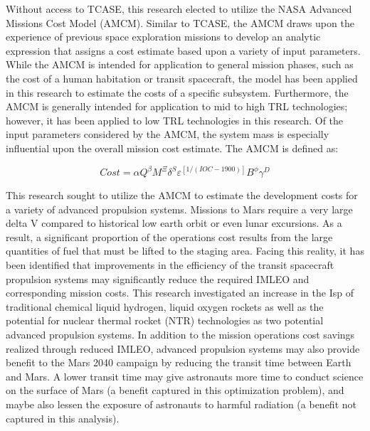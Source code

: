 \documentclass[]{aiaa-pretty}
\begin{document}
Without access to TCASE, this research elected to utilize the NASA Advanced Missions Cost Model (AMCM). Similar to TCASE, the AMCM draws upon the experience of previous space exploration missions to develop an analytic expression that assigns a cost estimate based upon a variety of input parameters. While the AMCM is intended for application to general mission phases, such as the cost of a human habitation or transit spacecraft, the model has been applied in this research to estimate the costs of a specific subsystem. Furthermore, the AMCM is generally intended for application to mid to high TRL technologies; however, it has been applied to low TRL technologies in this research. \cite{jones2015estimating} Of the input parameters considered by the AMCM, the system mass is especially influential upon the overall mission cost estimate. The AMCM is defined as: \cite{larson1999human}

\[ Cost = \alpha Q^\beta M^\Xi \delta^S \varepsilon^{[1/(IOC-1900)]} B^\phi \gamma^D \]

This research sought to utilize the AMCM to estimate the development costs for a variety of advanced propulsion systems. Missions to Mars require a very large delta V compared to historical low earth orbit or even lunar excursions. As a result, a significant proportion of the operations cost results from the large quantities of fuel that must be lifted to the staging area. Facing this reality, it has been identified that improvements in the efficiency of the transit spacecraft propulsion systems may significantly reduce the required IMLEO and corresponding mission costs. This research investigated an increase in the Isp of traditional chemical liquid hydrogen, liquid oxygen rockets as well as the potential for nuclear thermal rocket (NTR) technologies as two potential advanced propulsion systems. In addition to the mission operations cost savings realized through reduced IMLEO, advanced propulsion systems may also provide benefit to the Mars 2040 campaign by reducing the transit time between Earth and Mars. A lower transit time may give astronauts more time to conduct science on the surface of Mars (a benefit captured in this optimization problem), and maybe also lessen the exposure of astronauts to harmful radiation (a benefit not captured in this analysis).
\end{document}
